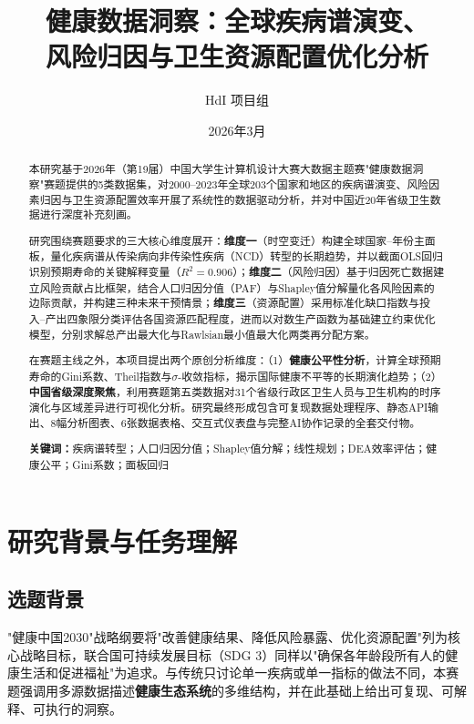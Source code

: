 \documentclass[12pt,a4paper]{ctexart}
\title{\textbf{健康数据洞察：全球疾病谱演变、\\风险归因与卫生资源配置优化分析}}
\author{HdI 项目组}
\date{2026年3月}
\begin{document}
\maketitle

\begin{abstract}
本研究基于2026年（第19届）中国大学生计算机设计大赛大数据主题赛"健康数据洞察"赛题提供的5类数据集，对2000--2023年全球203个国家和地区的疾病谱演变、风险因素归因与卫生资源配置效率开展了系统性的数据驱动分析，并对中国近20年省级卫生数据进行深度补充刻画。

研究围绕赛题要求的三大核心维度展开：\textbf{维度一}（时空变迁）构建全球国家--年份主面板，量化疾病谱从传染病向非传染性疾病（NCD）转型的长期趋势，并以截面OLS回归识别预期寿命的关键解释变量（$R^2 = 0.906$）；\textbf{维度二}（风险归因）基于归因死亡数据建立风险贡献占比框架，结合人口归因分值（PAF）与Shapley值分解量化各风险因素的边际贡献，并构建三种未来干预情景；\textbf{维度三}（资源配置）采用标准化缺口指数与投入--产出四象限分类评估各国资源匹配程度，进而以对数生产函数为基础建立约束优化模型，分别求解总产出最大化与Rawlsian最小值最大化两类再分配方案。

在赛题主线之外，本项目提出两个原创分析维度：（1）\textbf{健康公平性分析}，计算全球预期寿命的Gini系数、Theil指数与$\sigma$-收敛指标，揭示国际健康不平等的长期演化趋势；（2）\textbf{中国省级深度聚焦}，利用赛题第五类数据对31个省级行政区卫生人员与卫生机构的时序演化与区域差异进行可视化分析。研究最终形成包含可复现数据处理程序、静态API输出、8幅分析图表、6张数据表格、交互式仪表盘与完整AI协作记录的全套交付物。

\noindent\textbf{关键词：}疾病谱转型；人口归因分值；Shapley值分解；线性规划；DEA效率评估；健康公平；Gini系数；面板回归
\end{abstract}

\tableofcontents
\newpage

\section{研究背景与任务理解}

\subsection{选题背景}

"健康中国2030"战略纲要将"改善健康结果、降低风险暴露、优化资源配置"列为核心战略目标，联合国可持续发展目标（SDG 3）同样以"确保各年龄段所有人的健康生活和促进福祉"为追求。与传统只讨论单一疾病或单一指标的做法不同，本赛题强调用多源数据描述\textbf{健康生态系统}的多维结构，并在此基础上给出可复现、可解释、可执行的洞察。
\end{document}

